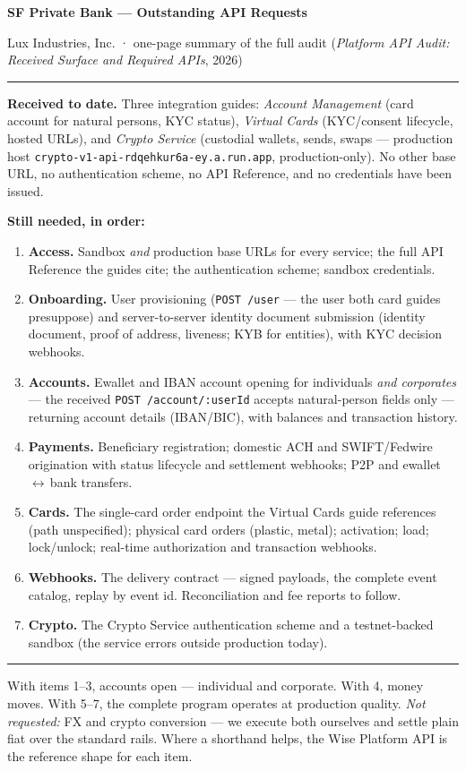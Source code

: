 \documentclass[10pt]{article}
\newcommand{\ep}[1]{\texttt{\small #1}}
\begin{document}
{\LARGE\bfseries SF Private Bank --- Outstanding API Requests}\par
{\small Lux Industries, Inc. \; · \; one-page summary of the full
audit (\emph{Platform API Audit: Received Surface and Required
APIs}, 2026)}

\vspace{6pt}\hrule\vspace{8pt}

\textbf{Received to date.} Three integration guides: \emph{Account
Management} (card account for natural persons, KYC status),
\emph{Virtual Cards} (KYC/consent lifecycle, hosted URLs), and
\emph{Crypto Service} (custodial wallets, sends, swaps --- production
host \ep{crypto-v1-api-rdqehkur6a-ey.a.run.app}, production-only).
No other base URL, no authentication scheme, no API Reference, and no
credentials have been issued.

\textbf{Still needed, in order:}

\begin{enumerate}[leftmargin=1.4em, itemsep=3pt]
\item \textbf{Access.} Sandbox \emph{and} production base URLs for
  every service; the full API Reference the guides cite; the
  authentication scheme; sandbox credentials.
\item \textbf{Onboarding.} User provisioning
  (\ep{POST /user} --- the user both card guides presuppose) and
  server-to-server identity document submission (identity document,
  proof of address, liveness; KYB for entities), with KYC decision
  webhooks.
\item \textbf{Accounts.} Ewallet and IBAN account opening for
  individuals \emph{and corporates} --- the received
  \ep{POST /account/:userId} accepts natural-person fields only ---
  returning account details (IBAN/BIC), with balances and
  transaction history.
\item \textbf{Payments.} Beneficiary registration; domestic ACH and
  SWIFT/Fedwire origination with status lifecycle and settlement
  webhooks; P2P and ewallet\,$\leftrightarrow$\,bank transfers.
\item \textbf{Cards.} The single-card order endpoint the Virtual
  Cards guide references (path unspecified); physical card orders
  (plastic, metal); activation; load; lock/unlock; real-time
  authorization and transaction webhooks.
\item \textbf{Webhooks.} The delivery contract --- signed payloads,
  the complete event catalog, replay by event id. Reconciliation and
  fee reports to follow.
\item \textbf{Crypto.} The Crypto Service authentication scheme and a
  testnet-backed sandbox (the service errors outside production
  today).
\end{enumerate}

\vspace{2pt}\hrule\vspace{6pt}

{\small With items 1--3, accounts open --- individual and corporate.
With 4, money moves. With 5--7, the complete program operates at
production quality. \emph{Not requested:} FX and crypto conversion
--- we execute both ourselves and settle plain fiat over the standard
rails. Where a shorthand helps, the Wise Platform API is the
reference shape for each item.}
\end{document}
